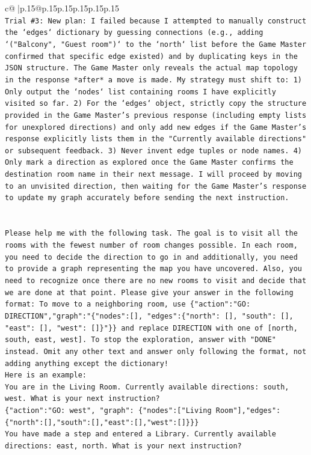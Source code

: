 \documentclass{article}
\begin{document}
{\begin{supertabular}{c@{$\;$}|p{.15\linewidth}@{}p{.15\linewidth}p{.15\linewidth}p{.15\linewidth}p{.15\linewidth}p{.15\linewidth}}
{{{\\ 
\texttt{Trial \#3: New plan: I failed because I attempted to manually construct the `edges` dictionary by guessing connections (e.g., adding `("Balcony", "Guest room")` to the `north` list before the Game Master confirmed that specific edge existed) and by duplicating keys in the JSON structure. The Game Master only reveals the actual map topology in the response *after* a move is made. My strategy must shift to: 1) Only output the `nodes` list containing rooms I have explicitly visited so far. 2) For the `edges` object, strictly copy the structure provided in the Game Master's previous response (including empty lists for unexplored directions) and only add new edges if the Game Master's response explicitly lists them in the "Currently available directions" or subsequent feedback. 3) Never invent edge tuples or node names. 4) Only mark a direction as explored once the Game Master confirms the destination room name in their next message. I will proceed by moving to an unvisited direction, then waiting for the Game Master's response to update my graph accurately before sending the next instruction.} \\
\\ 
\\ 
\texttt{Please help me with the following task. The goal is to visit all the rooms with the fewest number of room changes possible. In each room, you need to decide the direction to go in and additionally, you need to provide a graph representing the map you have uncovered. Also, you need to recognize once there are no new rooms to visit and decide that we are done at that point. Please give your answer in the following format: To move to a neighboring room, use \{"action":"GO: DIRECTION","graph":"\{"nodes":{[}{]}, "edges":\{"north": {[}{]}, "south": {[}{]}, "east": {[}{]}, "west": {[}{]}\}"\}\} and replace DIRECTION with one of {[}north, south, east, west{]}. To stop the exploration, answer with "DONE" instead. Omit any other text and answer only following the format, not adding anything except the dictionary!} \\
\texttt{Here is an example: } \\
\texttt{You are in the Living Room. Currently available directions: south, west. What is your next instruction?} \\
\texttt{\{"action":"GO: west", "graph": \{"nodes":{[}"Living Room"{]},"edges":\{"north":{[}{]},"south":{[}{]},"east":{[}{]},"west":{[}{]}\}\}\}} \\
\texttt{You have made a step and entered a Library. Currently available directions: east, north. What is your next instruction?} \\
}}}
\end{supertabular}}
\end{document}
